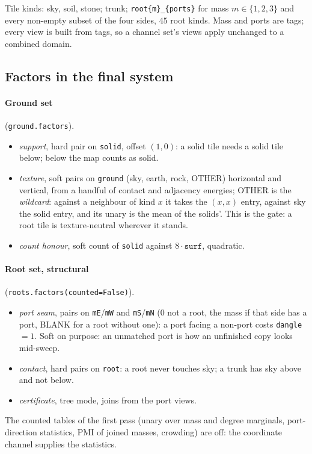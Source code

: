 \documentclass[11pt]{article}
\newcommand{\1}{\mathds{1}}
\newcommand{\code}[1]{\texttt{#1}}
\begin{document}
\noindent Tile kinds: sky, soil, stone; trunk; \code{root\{m\}\_\{ports\}} for
mass $m \in \{1,2,3\}$ and every non-empty subset of the four sides,
$45$ root kinds. Mass and ports are tags; every view is built from tags,
so a channel set's views apply unchanged to a combined domain.

\subsection{Factors in the final system}

\paragraph{Ground set} (\code{ground.factors}).
\begin{itemize}
\item \emph{support}, hard pair on \code{solid}, offset $(1, 0)$: a solid
  tile needs a solid tile below; below the map counts as solid.
\item \emph{texture}, soft pairs on \code{ground} (sky, earth, rock, OTHER)
  horizontal and vertical, from a handful of contact and adjacency
  energies; OTHER is the \emph{wildcard}: against a neighbour of kind $x$
  it takes the $(x, x)$ entry, against sky the solid entry, and its unary
  is the mean of the solids'. This is the gate: a root tile is
  texture-neutral wherever it stands.
\item \emph{count honour}, soft count of \code{solid} against
  $8 \cdot \code{surf}$, quadratic.
\end{itemize}

\paragraph{Root set, structural} (\code{roots.factors(counted=False)}).
\begin{itemize}
\item \emph{port seam}, pairs on \code{mE}/\code{mW} and \code{mS}/\code{mN}
  (0 not a root, the mass if that side has a port, BLANK for a root without
  one): a port facing a non-port costs \code{dangle} $= 1$. Soft on
  purpose: an unmatched port is how an unfinished copy looks mid-sweep.
\item \emph{contact}, hard pairs on \code{root}: a root never touches sky;
  a trunk has sky above and not below.
\item \emph{certificate}, tree mode, joins from the port views.
\end{itemize}
The counted tables of the first pass (unary over mass and degree
marginals, port-direction statistics, PMI of joined masses, crowding) are
off: the coordinate channel supplies the statistics.
\end{document}
